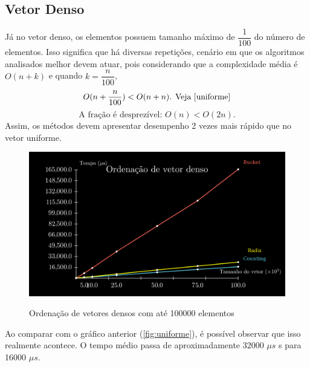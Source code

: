 \documentclass[fontsize=11pt]{article}
\begin{document}
    \subsection{Vetor Denso}
      Já no vetor denso, os elementos possuem tamanho máximo de $\dfrac{1}{100}$ do número de elementos. Isso
      significa que há diversas repetições, cenário em que os algoritmos analisados melhor devem atuar, 
      pois considerando que a complexidade média é $O(n+k)$ e quando $k=\dfrac{n}{100}$, 
      $$O(n+\dfrac{n}{100}) < O(n+n) \text{. Veja } \ref{uniforme}$$ 
      $$\text{A fração é desprezível: }O(n) < O(2n).$$
      Assim, os métodos devem apresentar desempenho 2 vezes mais rápido que no vetor uniforme. 
      \begin{figure}[H]
        \caption{Ordenação de vetores densos com até 100000 elementos}
        \includegraphics[width=\textwidth]{denso.png}
        \label{fig:denso}
      \end{figure}
      Ao comparar com o gráfico anterior (\ref{fig:uniforme}), é possível observar que isso realmente acontece. 
      O tempo médio passa de aproximadamente 32000 $\mu s$ s para 16000 $\mu s$. 
    \newpage
\end{document}
